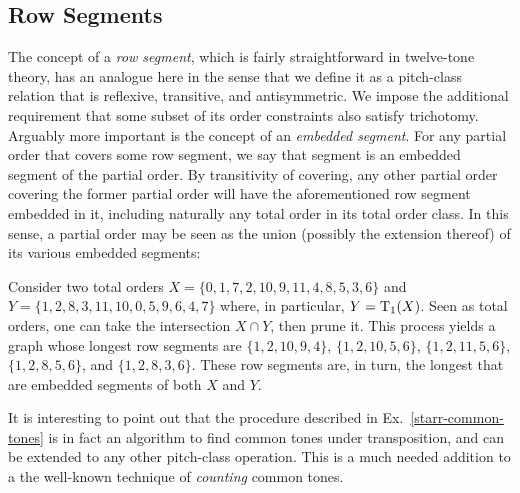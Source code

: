 \subsection{Row Segments}

The concept of a \emph{row segment}, which is fairly straightforward in twelve-tone theory, has an analogue here in the sense that we define it as a pitch-class relation that is reflexive, transitive, and antisymmetric. We impose the additional requirement that some subset of its order constraints also satisfy trichotomy. Arguably more important is the concept of an \emph{embedded segment}. For any partial order that covers some row segment, we say that segment is an embedded segment of the partial order. By transitivity of covering, any other partial order covering the former partial order will have the aforementioned row segment embedded in it, including naturally any total order in its total order class. In this sense, a partial order may be seen as the union (possibly the extension thereof) of its various embedded segments:

\begin{example}
    \label{starr-common-tones}
    \cite[200]{Starr1984}
    Consider two total orders $X = \{ 0, 1, 7, 2, 10, 9, 11, 4, 8, 5, 3, 6 \}$ and $Y = \{ 1, 2, 8, 3, 11, 10, 0, 5, 9, 6, 4, 7 \}$ where, in particular, $Y = \operatorname{T}_1(X)$. Seen as total orders, one can take the intersection $X \cap Y$, then prune it. This process yields a graph whose longest row segments are $\{ 1, 2, 10, 9, 4 \}$, $\{ 1, 2, 10, 5, 6 \}$, $\{ 1, 2, 11, 5, 6 \}$, $\{ 1, 2, 8, 5, 6 \}$, and $\{ 1, 2, 8, 3, 6 \}$. These row segments are, in turn, the longest that are embedded segments of both $X$ and $Y$.
\end{example}

It is interesting to point out that the procedure described in Ex.~\ref{starr-common-tones} is in fact an algorithm to find common tones under transposition, and can be extended to any other pitch-class operation. This is a much needed addition to a the well-known technique of \emph{counting} common tones.

